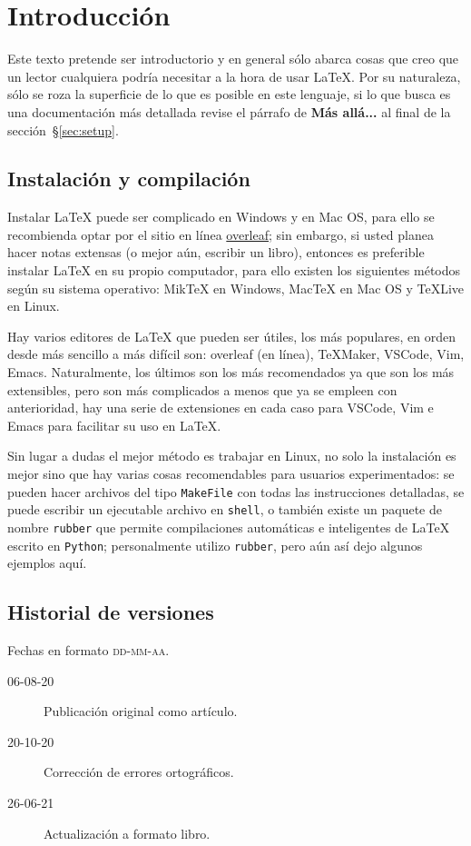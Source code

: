 \chapter{Introducción}
Este texto pretende ser introductorio y en general sólo abarca cosas que creo que un lector cualquiera podría necesitar a la hora de usar \LaTeX{}. Por su naturaleza, sólo se roza la superficie de lo que es posible en este lenguaje, si lo que busca es una documentación más detallada revise el párrafo de \textbf{Más allá...} al final de la sección~\S\ref{sec:setup}.

\section*{Instalación y compilación}
Instalar \LaTeX{} puede ser complicado en Windows y en Mac OS, para ello se recombienda optar por el sitio en línea
\href{https://www.overleaf.com/}{\sffamily\color{newgreen}overleaf};
sin embargo, si usted planea hacer notas extensas (o mejor aún, escribir un libro), entonces es preferible instalar \LaTeX{} en su propio computador,
para ello existen los siguientes métodos según su sistema operativo:
Mik\TeX{} en Windows, Mac\TeX{} en Mac OS y \TeX{}Live en Linux.

Hay varios editores de \LaTeX{} que pueden ser útiles, los más populares, en orden desde más sencillo a más difícil son:
overleaf (en línea), \TeX{}Maker, VSCode, Vim, Emacs.
Naturalmente, los últimos son los más recomendados ya que son los más extensibles, pero son más complicados a menos que ya se empleen con anterioridad,
hay una serie de extensiones en cada caso para VSCode, Vim e Emacs para facilitar su uso en \LaTeX{}.

Sin lugar a dudas el mejor método es trabajar en Linux, no solo la instalación es mejor sino que hay varias cosas recomendables para usuarios
experimentados:
se pueden hacer archivos del tipo \texttt{MakeFile} con todas las instrucciones detalladas,
se puede escribir un ejecutable archivo en \texttt{shell},
o también existe un paquete de nombre \texttt{rubber} que permite compilaciones automáticas e inteligentes de \LaTeX{} escrito en \texttt{Python};
personalmente utilizo \texttt{rubber}, pero aún así dejo algunos ejemplos aquí.

\section*{Historial de versiones}
Fechas en formato \textsc{dd-mm-aa}. 
\begin{description}
	\item[06-08-20] Publicación original como artículo.
	\item[20-10-20] Corrección de errores ortográficos.
	\item[26-06-21] Actualización a formato libro.
\end{description}

